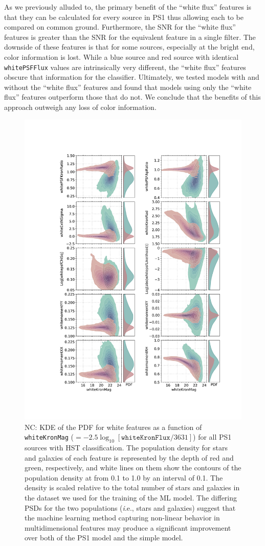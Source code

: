 \documentclass[twocolumn]{aastex62}
\newcommand{\NC}[1]{{\color{gray} NC: {#1}}}
\begin{document}
As we previously alluded to, the primary benefit of the ``white flux'' features is that they can be calculated for every source in PS1 thus allowing each to be compared on common ground. Furthermore, the SNR for the ``white flux'' features is greater than the SNR for the equivalent feature in a single filter. The downside of these features is that for some sources, especially at the bright end, color information is lost. While a blue source and red source with identical \texttt{whitePSFFlux} values are intrinsically very different, the ``white flux'' features obscure that information for the classifier. Ultimately, we tested models with and without the ``white flux'' features and found that models using only the ``white flux'' features outperform those that do not. We conclude that the benefits of this approach outweigh any loss of color information. 

\begin{figure}[t]
 \centering
  \includegraphics[width=3.5in
  ]{./Figures/whiteFeatures.pdf}
  \caption{
  \NC{KDE of the PDF for white features as a function of \texttt{whiteKronMag}
  ($=-2.5\log_{10}[\mathtt{whiteKronFlux}/3631]$) 
  for all PS1 sources with HST classification. 
  The population density for stars and galaxies of each feature is represented by the depth of red and green, respectively, 
  and white lines on them show the contours of the population density at from 0.1 to 1.0 by an interval of 0.1.
  The density is scaled relative to the total number of stars and galaxies in the dataset we used for the training of the ML model. 
  The differing PSDs for the two populations ({\textit i.e.,} stars and galaxies) suggest that 
  the machine learning method capturing non-linear behavior in multidimensional features 
  may produce a significant improvement over both of the PS1 model and the simple model. }
  }
  \label{fig:features}
\end{figure}
\end{document}
